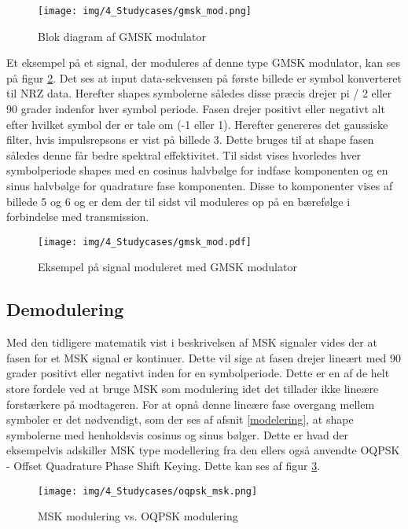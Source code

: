 \begin{appendices}
\begin{figure}[H]
	\centering{}
	\texttt{[image: img/4\_Studycases/gmsk\_mod.png]}
	\caption{Blok diagram af GMSK modulator}
	\label{fig:gmsk_mod}
\end{figure} 

Et eksempel på et signal, der moduleres af denne type GMSK modulator, kan ses på figur \ref{fig:gmsk_mod_ex}. Det ses at input data-sekvensen på første billede er symbol konverteret til NRZ data. Herefter shapes symbolerne således disse præcis drejer pi / 2 eller 90 grader indenfor hver symbol periode. Fasen drejer positivt eller negativt alt efter hvilket symbol der er tale om (-1 eller 1). Herefter genereres det gaussiske filter, hvis impulsrepsons er vist på billede 3. Dette bruges til at shape fasen således denne får bedre spektral effektivitet. Til sidst vises hvorledes hver symbolperiode shapes med en cosinus halvbølge for indfase komponenten og en sinus halvbølge for quadrature fase komponenten. Disse to komponenter vises af billede 5 og 6 og er dem der til sidst vil moduleres op på en bærefølge i forbindelse med transmission. 

\begin{figure}[H]
	\centering{}
	\texttt{[image: img/4\_Studycases/gmsk\_mod.pdf]}
	\caption{Eksempel på signal moduleret med GMSK modulator}
	\label{fig:gmsk_mod_ex}
\end{figure} 

\pagebreak
\subsection{Demodulering}
Med den tidligere matematik vist i beskrivelsen af MSK signaler vides der at fasen for et MSK signal er kontinuer. Dette vil sige at fasen drejer lineært med 90 grader positivt eller negativt inden for en symbolperiode. Dette er en af de helt store fordele ved at bruge MSK som modulering idet det tillader ikke lineære forstærkere på modtageren. For at opnå denne lineære fase overgang mellem symboler er det nødvendigt, som der ses af afsnit \ref{modelering}, at shape symbolerne med henholdsvis cosinus og sinus bølger. Dette er hvad der eksempelvis adskiller MSK type modellering fra den ellers også anvendte OQPSK - Offset Quadrature Phase Shift Keying. Dette kan ses af figur \ref{fig:oqpsk_msk}. 

\begin{figure}[H]
	\centering{}
	\texttt{[image: img/4\_Studycases/oqpsk\_msk.png]}
	\caption{MSK modulering vs. OQPSK modulering}
	\label{fig:oqpsk_msk}
\end{figure} 


\end{appendices}
